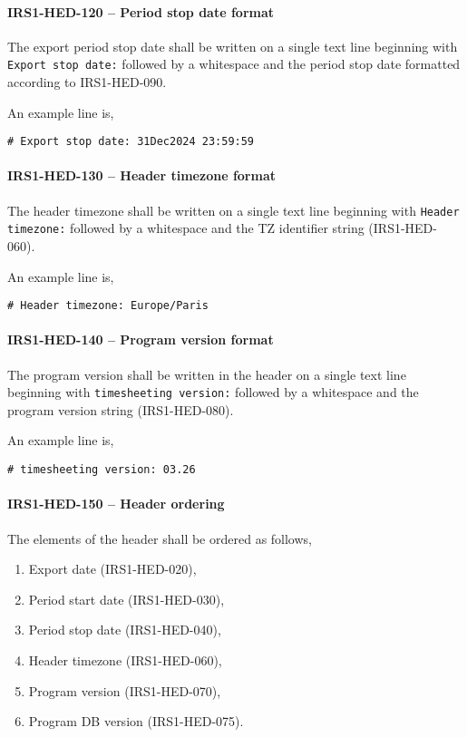 \paragraph{IRS1-HED-120 -- Period stop date format}
The export period stop date shall be written on a single text line beginning
with \lstinline{Export stop date:} followed by a whitespace and the period
stop date formatted according to IRS1-HED-090.

An example line is,
\begin{lstlisting}[numbers=none]
  # Export stop date: 31Dec2024 23:59:59
\end{lstlisting}

\paragraph{IRS1-HED-130 -- Header timezone format}
The header timezone shall be written on a single text line
beginning with \lstinline{Header timezone:} followed by a whitespace
and the TZ identifier string (IRS1-HED-060).

An example line is,
\begin{lstlisting}[numbers=none]
  # Header timezone: Europe/Paris
\end{lstlisting}

\paragraph{IRS1-HED-140 -- Program version format}
The program version shall be written in the header on a single text line
beginning with \lstinline{timesheeting version:} followed by a whitespace
and the program version string (IRS1-HED-080).

An example line is,
\begin{lstlisting}[numbers=none]
  # timesheeting version: 03.26
\end{lstlisting}

\paragraph{IRS1-HED-150 -- Header ordering}
The elements of the header shall be ordered as follows,
\begin{enumerate}
\item Export date (IRS1-HED-020),
\item Period start date (IRS1-HED-030),
\item Period stop date (IRS1-HED-040),
\item Header timezone (IRS1-HED-060),
\item Program version (IRS1-HED-070),
\item Program \gls{DB} version (IRS1-HED-075).
\end{enumerate}


